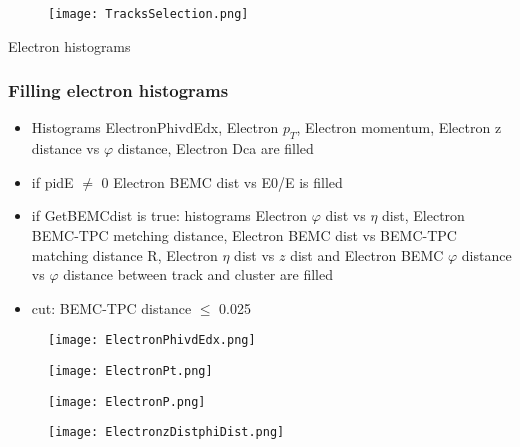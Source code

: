 \documentclass{beamer}
\begin{document}
\begin{frame}
	\begin{figure}[h!]
		\centering
		\texttt{[image: TracksSelection.png]}
	\end{figure}
\end{frame}

\begin{frame}
	\begin{center}
		\Huge Electron histograms
	\end{center}
\end{frame}

\begin{frame}
  \frametitle{Filling electron histograms}
  \begin{itemize}
  \item Histograms ElectronPhivdEdx, Electron $p_T$, Electron momentum, Electron z distance vs $\varphi$ distance, Electron Dca are filled
  \item if pidE $\neq$ 0 Electron BEMC dist vs E0/E is filled
  \item if GetBEMCdist is true: histograms Electron $\varphi$ dist vs $\eta$ dist, Electron BEMC-TPC metching distance, Electron BEMC dist vs BEMC-TPC matching distance R, Electron $\eta$ dist vs $z$ dist and Electron BEMC $\varphi$ distance vs $\varphi$ distance between track and cluster are filled
  \item cut: BEMC-TPC distance $\leq$ 0.025
  \end{itemize}
\end{frame}

\begin{frame}
  \begin{figure}[h!]
  \centering
  \texttt{[image: ElectronPhivdEdx.png]}
  \end{figure}
\end{frame}

\begin{frame}
  \begin{figure}[h!]
  \centering
  \texttt{[image: ElectronPt.png]}
  \end{figure}
\end{frame}

\begin{frame}
  \begin{figure}[h!]
  \centering
  \texttt{[image: ElectronP.png]}
  \end{figure}
\end{frame}

\begin{frame}
  \begin{figure}[h!]
  \centering
  \texttt{[image: ElectronzDistphiDist.png]}
  \end{figure}
\end{frame}
\end{document}
